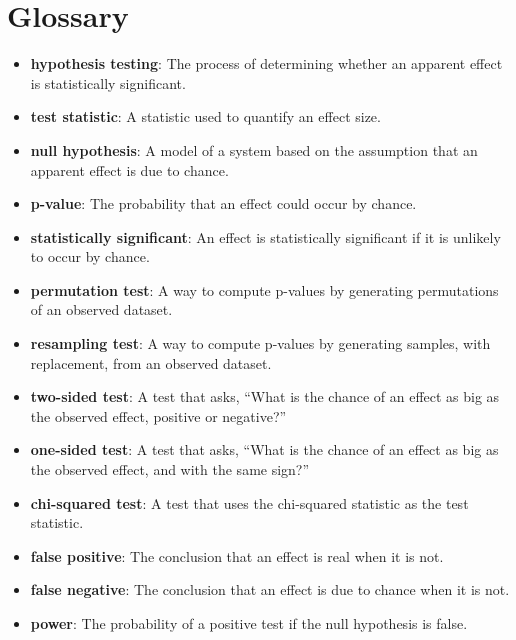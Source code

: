   \section*{Glossary} \begin{itemize}
	
	\item {\bf hypothesis testing}: The process of determining whether an apparent
	effect is statistically significant.
	
	\item {\bf test statistic}: A statistic used to quantify an effect size.
	
	\item {\bf null hypothesis}: A model of a system based on the assumption that
	an apparent effect is due to chance.
	
	\item {\bf p-value}: The probability that an effect could occur by chance.
	
	\item {\bf statistically significant}: An effect is statistically
	significant if it is unlikely to occur by chance.
	 
	
	\item {\bf permutation test}: A way to compute p-values by generating
	permutations of an observed dataset.
	
	\item {\bf resampling test}: A way to compute p-values by generating
	samples, with replacement, from an observed dataset.
	
	\item {\bf two-sided test}: A test that asks, ``What is the chance of an effect
	as big as the observed effect, positive or negative?''
	
	\item {\bf one-sided test}: A test that asks, ``What is the chance of an effect
	as big as the observed effect, and with the same sign?''
	
	\item {\bf chi-squared test}: A test that uses the chi-squared statistic as
	the test statistic.
	
	\item {\bf false positive}: The conclusion that an effect is real when it is not.
	
	\item {\bf false negative}: The conclusion that an effect is due to chance when it
	is not.
	
	\item {\bf power}: The probability of a positive test if the null hypothesis
	is false.
	
\end{itemize}


